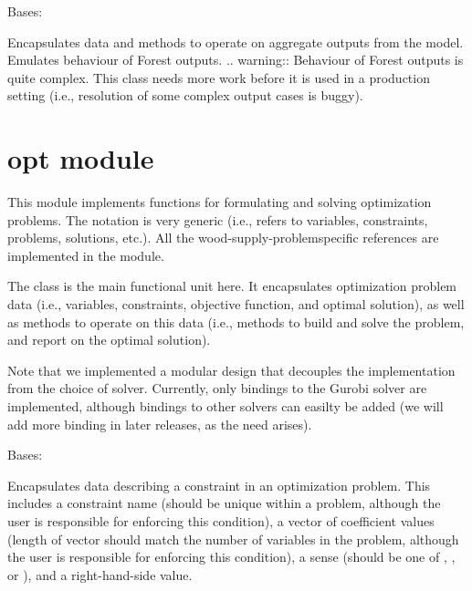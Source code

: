 \documentclass[letterpaper,10pt,english]{sphinxmanual}
\begin{document}

\begin{fulllineitems}
\label{\detokenize{forest:forest.Output}}
Bases: 

Encapsulates data and methods to operate on aggregate outputs from the model.
Emulates behaviour of Forest outputs.
.. warning:: Behaviour of Forest outputs is quite complex. 
This class needs more work before it is used in a production setting 
(i.e., resolution of some complex output cases is buggy).

\end{fulllineitems}



\section{opt module}
\label{\detokenize{opt::doc}}\label{\detokenize{opt:module-opt}}\label{\detokenize{opt:opt-module}}
This module implements functions for formulating and solving optimization problems.
The notation is very generic (i.e., refers to variables, constraints, problems, solutions, etc.).
All the wood-supply-problem\textendash{}specific references are implemented in the  module.

The  class is the main functional unit here. It encapsulates optimization problem data (i.e., variables, constraints, objective function, and optimal solution), as well as methods to operate on this data (i.e., methods to build and solve the problem, and report on the optimal solution).

Note that we implemented a modular design that decouples the implementation from the choice of solver. Currently, only bindings to the Gurobi solver are implemented, although bindings to other solvers can easilty be added (we will add more binding in later releases, as the need arises).

\begin{fulllineitems}
\label{\detokenize{opt:opt.Constraint}}
Bases: 

Encapsulates data describing a constraint in an optimization problem. This includes a constraint name (should be unique within a problem, although the user is responsible for enforcing this condition), a vector of coefficient values (length of vector should match the number of variables in the problem, although the user is responsible for enforcing this condition), a sense (should be one of , , or ), and a right-hand-side value.

\end{fulllineitems}
\end{document}
